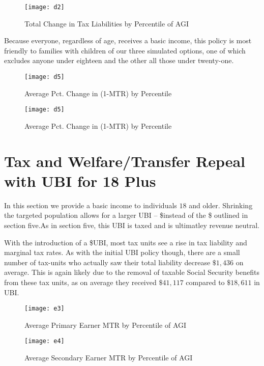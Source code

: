 \documentclass{article}
\begin{document}
\begin{figure}[H]
\centering
\caption{Total Change in Tax Liabilities by Percentile of AGI}
\texttt{[image: d2]}
\end{figure}

Because everyone, regardless of age, receives a basic income, this policy is most friendly to families with children of our three simulated options, one of which excludes anyone under eighteen and the other all those under twenty-one.

\begin{figure}[H]
\centering
\caption{Average Pct. Change in (1-MTR) by Percentile}
\texttt{[image: d5]}
\end{figure}

\begin{figure}[H]
\centering
\caption{Average Pct. Change in (1-MTR) by Percentile}
\texttt{[image: d5]}
\end{figure}

\section{Tax and Welfare/Transfer Repeal with UBI for 18 Plus}
In this section we provide a basic income to individuals $18$ and older. Shrinking the targeted population allows for a larger UBI -- \$\exaa{}instead of the \$\dxaa{} outlined in section five.\ospc As in section five, this UBI is taxed and is ultimatley revenue neutral.

With the introduction of a \$\exaa{}UBI, most tax units see a rise in tax liability and marginal tax rates. As with the initial UBI policy though, there are a small number of tax-units who actually saw their total liability decrease $\$1,436$ on average. This is again likely due to the removal of taxable Social Security benefits from these tax units, as on average they received $\$41,117$ compared to $\$18,611$ in UBI.\ospc

\begin{figure}[H]
\centering
\caption{Average Primary Earner MTR by Percentile of AGI}
\texttt{[image: e3]}
\end{figure}

\begin{figure}[H]
\centering
\caption{Average Secondary Earner MTR by Percentile of AGI}
\texttt{[image: e4]}
\end{figure}
\end{document}
